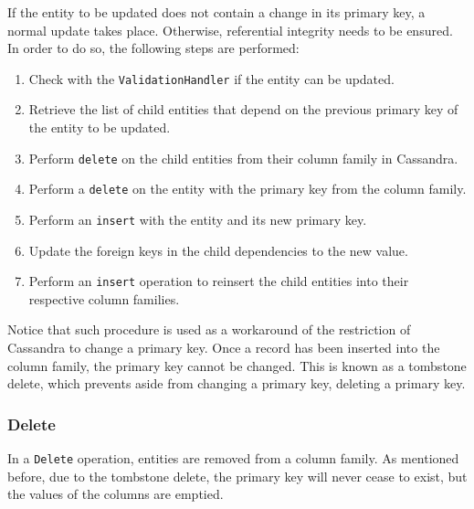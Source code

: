 		 If the entity to be updated does not contain a change in its primary key, a
		 normal update takes place. Otherwise, referential integrity needs to be
		 ensured. In order to do so, the following steps are performed:
		\begin{enumerate}
		  \item Check with the \texttt{ValidationHandler} if the entity can be
		  updated.
		  \item Retrieve the list of child entities that depend on the previous
		  primary key of the entity to be updated.
		  \item Perform \texttt{delete} on the child entities from their column family
		  in Cassandra.
		  \item Perform a \texttt{delete} on the entity with the primary key from the
		  column family.
		  \item Perform an \texttt{insert} with the entity and its new primary key.
		  \item Update the foreign keys in the child dependencies to
		  the new value.
		  \item Perform an \texttt{insert} operation to reinsert the child entities
		  into their respective column families.
		\end{enumerate}
		
		
		Notice that such procedure is used as a workaround of the restriction of
		Cassandra to change a primary key. Once a record has been
		inserted into the column family, the primary key cannot  be changed. This is
		known as a tombstone delete, which prevents aside from changing a primary
		key, deleting a primary key.
		
		\subsubsection{Delete}\label{ss:delete}
		In a  \texttt{Delete} operation, entities are removed from a column
		family. As mentioned before, due to the tombstone delete, the primary key
		will never cease to exist, but the values of the columns are emptied. 
		
